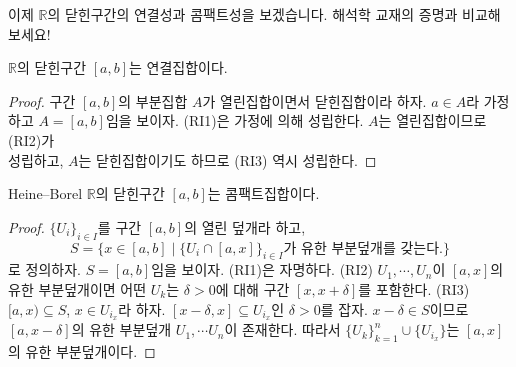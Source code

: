 \documentclass[serif]{beamer}
\begin{document}
\begin{frame}{}
    이제 $\mathbb R$의 닫힌구간의 연결성과 콤팩트성을 보겠습니다. 해석학 교재의 증명과 비교해 보세요!
    \begin{thm*}{}
        $\mathbb R$의 닫힌구간 $[a,b]$는 연결집합이다.
    \end{thm*}
    \begin{proof}
        구간 $[a,b]$의 부분집합 $A$가 열린집합이면서 닫힌집합이라 하자. $a\in A$라 가정하고 $A=[a,b]$임을 보이자. (RI1)은 가정에 의해 성립한다.
        $A$는 열린집합이므로 (RI2)가 \\ 성립하고, $A$는 닫힌집합이기도 하므로 (RI3) 역시 성립한다.
    \end{proof}
    \begin{thm*}{Heine--Borel}
        $\mathbb R$의 닫힌구간 $[a,b]$는 콤팩트집합이다.
    \end{thm*}
    \begin{proof}
        $\{U_i\}_{i\in I}$를 구간 $[a,b]$의 열린 덮개라 하고,
        \[
            S=\{x\in[a,b]\mid \{U_i\cap[a,x]\}_{i\in I}\text{가 유한 부분덮개를 갖는다.}\}
        \]
        로 정의하자. $S=[a,b]$임을 보이자. (RI1)은 자명하다.
        (RI2) $U_1,\cdots,U_n$이 $[a,x]$의 유한 부분덮개이면 어떤 $U_k$는 $\delta>0$에 대해 구간 $[x,x+\delta]$를 포함한다.
        (RI3) $[a,x)\subseteq S$, $x\in U_{i_x}$라 하자. $[x-\delta,x]\subseteq U_{i_x}$인  $\delta>0$를 잡자.
        $x-\delta\in S$이므로 $[a,x-\delta]$의 유한 부분덮개 $U_1,\cdots U_n$이 존재한다. 따라서 $\{U_k\}_{k=1}^n\cup\{U_{i_x}\}$는 $[a,x]$의 유한 부분덮개이다.
    \end{proof}
\end{frame}
\end{document}
